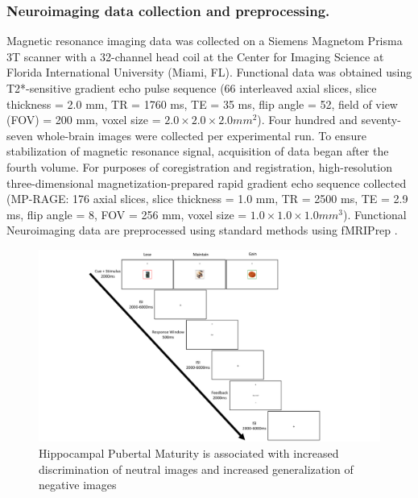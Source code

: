 \documentclass[11pt]{article}
\providecommand\citep{\cite}
\begin{document}
\subsubsection*{Neuroimaging data collection and preprocessing.}
Magnetic resonance imaging data was collected on a Siemens Magnetom Prisma 3T scanner
with a 32-channel head coil at the Center for Imaging Science at Florida International
University (Miami, FL). Functional data was obtained using T2*-sensitive gradient echo
pulse  sequence (66 interleaved axial slices, slice thickness = 2.0 mm, TR = 1760 ms,
TE = 35 ms, flip angle = 52\textdegree, field of view (FOV) = 200 mm, voxel size =
\(2.0 \times 2.0 \times 2.0 mm^2\)). Four hundred and seventy-seven whole-brain images 
were collected per experimental run. To ensure stabilization of magnetic resonance
signal, acquisition of data began after the fourth volume. For purposes of
coregistration and registration, high-resolution three-dimensional
magnetization-prepared rapid gradient echo sequence collected (MP-RAGE\@: 176 axial
slices, slice thickness = 1.0 mm, TR = 2500 ms, TE = 2.9 ms, flip angle = 8\textdegree,
FOV = 256 mm, voxel size = \(1.0 \times 1.0 \times 1.0 mm^3\)). Functional Neuroimaging
data are preprocessed using standard methods using fMRIPrep
\citep{esteban_fmriprep_2022}.

\begin{figure}%
    \includegraphics[width=14cm]{figures/aim_2_task.pdf}%
    \caption{Hippocampal Pubertal Maturity is associated with increased discrimination
        of neutral images and increased generalization of negative images}%
    \label{fig:2}%
\end{figure}
\end{document}
